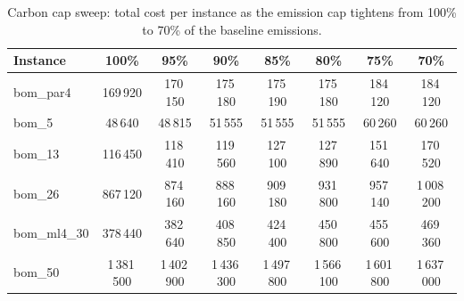 \begin{table}[!htbp]\centering\small
\caption{Carbon cap sweep: total cost per instance as the emission cap tightens from 100\% to 70\% of the baseline emissions.}\label{tab:cap}
\begin{tabular}{lccccccc}
\toprule
Instance & 100\% & 95\% & 90\% & 85\% & 80\% & 75\% & 70\%\\
\midrule
bom\_par4 & 169\,920 & 170\,150 & 175\,180 & 175\,190 & 175\,180 & 184\,120 & 184\,120 \\
bom\_5 & 48\,640 & 48\,815 & 51\,555 & 51\,555 & 51\,555 & 60\,260 & 60\,260 \\
bom\_13 & 116\,450 & 118\,410 & 119\,560 & 127\,100 & 127\,890 & 151\,640 & 170\,520 \\
bom\_26 & 867\,120 & 874\,160 & 888\,160 & 909\,180 & 931\,800 & 957\,140 & 1\,008\,200 \\
bom\_ml4\_30 & 378\,440 & 382\,640 & 408\,850 & 424\,400 & 450\,800 & 455\,600 & 469\,360 \\
bom\_50 & 1\,381\,500 & 1\,402\,900 & 1\,436\,300 & 1\,497\,800 & 1\,566\,100 & 1\,601\,800 & 1\,637\,000 \\
\bottomrule
\end{tabular}
\end{table}
